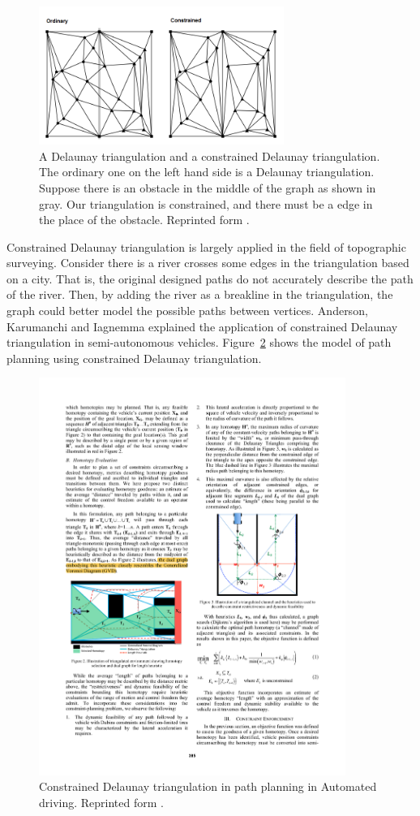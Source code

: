 \begin{figure}[ht]
\centering
\includegraphics[width=80mm]{Figures/CDT.png}
\caption[A Delaunay triangulation and a constrained Delaunay triangulation.]{A Delaunay triangulation and a constrained Delaunay triangulation. The  ordinary one on the left hand side is a Delaunay triangulation. Suppose there is an obstacle in the middle of the graph as shown in gray. Our triangulation is constrained, and there must be a edge in the place of the obstacle. Reprinted form \cite{github}.} 
\label{fig:CDT}
\end{figure}

Constrained Delaunay triangulation is largely applied in the field of topographic surveying. Consider there is a river crosses some edges in the triangulation based on a city. That is, the original designed paths do not accurately describe the path of the river. Then, by adding the river as a breakline in the triangulation, the graph could better model the possible paths between vertices. Anderson, Karumanchi and Iagnemma explained the application of constrained Delaunay triangulation in semi-autonomous vehicles. Figure~\ref{fig:auto} shows the model of path planning using constrained Delaunay triangulation.

\begin{figure}[ht]
\centering
\includegraphics[width=100mm]{Figures/auto.pdf}
\caption[Constrained Delaunay triangulation in path planning in Automated driving]{Constrained Delaunay triangulation in path planning in Automated driving. Reprinted form \cite{auto}.} 
\label{fig:auto}
\end{figure}





